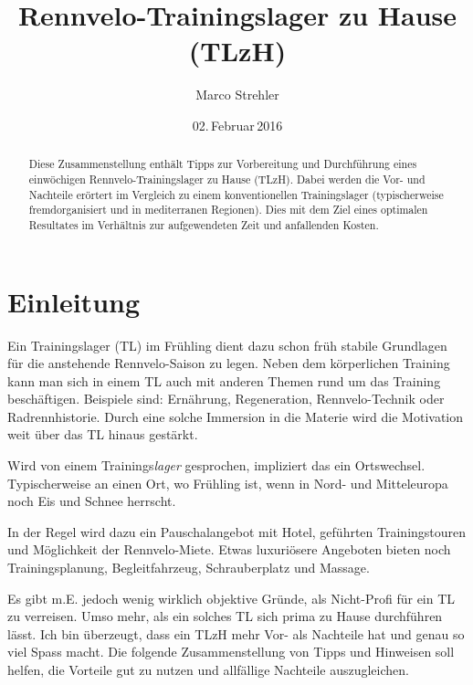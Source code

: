 \documentclass[a4paper,DIV13,BCOR0cm]{scrartcl}
\newcommand{\rv}{Rennvelo}
\newcommand{\tlzh}{TLzH}
\newcommand{\Tlzh}{Trainingslager zu Hause}
\begin{document}
\lhead{\tlzh}

\title{\rv-\Tlzh{} (\tlzh)}
\author{Marco Strehler}

\date{02.\,Februar\,2016}

\maketitle

\begin{abstract}
Diese Zusammenstellung enthält Tipps zur Vorbereitung und Durchführung eines einwöchigen \rv-Trainingslager zu Hause (\tlzh).
Dabei werden die Vor- und Nachteile erörtert im Vergleich zu einem konventionellen Trainingslager
(typischerweise fremdorganisiert und in mediterranen Regionen). 
Dies mit dem Ziel eines optimalen Resultates im Verhältnis zur aufgewendeten Zeit und anfallenden Kosten.
\end{abstract}

\tableofcontents
\section{Einleitung}

Ein Trainingslager (TL) im Frühling dient dazu
schon früh stabile Grundlagen für die anstehende \rv-Saison zu legen.
Neben dem körperlichen Training kann man sich in einem TL auch mit anderen Themen rund um das Training beschäftigen.
Beispiele sind: Ernährung, Regeneration, \rv-Technik oder Radrennhistorie.
Durch eine solche Immersion in die Materie wird die Motivation weit über das TL hinaus gestärkt.

Wird von einem Trainings\textsl{lager} gesprochen, impliziert das ein Ortswechsel.
Typischerweise an einen Ort, wo Frühling ist, wenn in Nord- und Mitteleuropa noch Eis und Schnee herrscht.

In der Regel wird dazu ein Pauschalangebot mit Hotel, geführten Trainingstouren und Möglichkeit der \rv-Miete.
Etwas luxuriösere Angeboten bieten noch Trainingsplanung, Begleitfahrzeug, Schrauberplatz und Massage.

Es gibt m.E. jedoch wenig wirklich objektive Gründe, als Nicht-Profi für ein TL zu verreisen.
Umso mehr, als ein solches TL sich prima zu Hause durchführen lässt.
Ich bin überzeugt, dass ein \tlzh{} mehr Vor- als Nachteile hat und genau so viel Spass macht.
Die folgende Zusammenstellung von Tipps und Hinweisen soll helfen, die Vorteile gut zu nutzen und allfällige Nachteile
auszugleichen.
\end{document}
